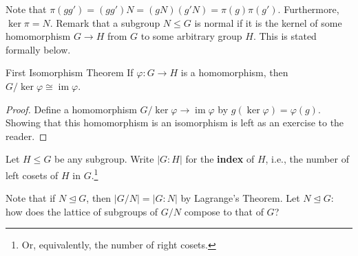 \documentclass{article}
\theoremstyle{plain}
\begin{document}
Note that $\pi(gg') = (gg')N = (gN)(g'N) = \pi(g)\pi(g')$. Furthermore, $\operatorname{ker}\pi = N$. Remark that a subgroup $N \le G$ is normal if it is the kernel of some homomorphism $G \to H$ from $G$ to some arbitrary group $H$. This is stated formally below.
\begin{theorem}{First Isomorphism Theorem}{}
If $\varphi : G \to H$ is a homomorphism, then $G/\operatorname{ker}\varphi \cong \operatorname{im}\varphi$.
\end{theorem}
\begin{proof}
Define a homomorphism $G/\operatorname{ker}\varphi \to \operatorname{im}\varphi$ by $g(\operatorname{ker}\varphi) = \varphi(g)$. Showing that this homomorphism is an isomorphism is left as an exercise to the reader.
\end{proof}
\begin{definition}{}{}
Let $H \le G$ be any subgroup. Write $|G:H|$ for the \textbf{index} of $H$, i.e., the number of left cosets of $H$ in $G$.\footnote{Or, equivalently, the number of right cosets.}
\end{definition}
Note that if $N \trianglelefteq G$, then $|G/N| = |G:N|$ by Lagrange's Theorem. Let $N \trianglelefteq G$: how does the lattice of subgroups of $G/N$ compose to that of $G$? 
\end{document}
